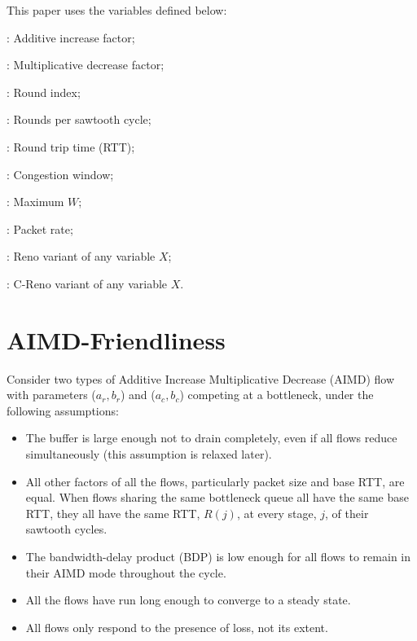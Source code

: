 This paper uses the variables defined below:
\begin{description}[nosep]
	\item[\(a\)]: Additive increase factor;
	\item[\(b\)]: Multiplicative decrease factor;
	\item[\(j\)]: Round index;
	\item[\(J\)]: Rounds per sawtooth cycle;
	\item[\(R(j)\)]: Round trip time (RTT);
	\item[\(W(j)\)]: Congestion window;
	\item[\(\widehat{W}\)]: Maximum \(W\);
	\item[\(r(j)\)]: Packet rate;
	\item[\(X_r\)]: Reno variant of any variable \(X\);
	\item[\(X_c\)]: C-Reno variant of any variable \(X\).
\end{description}

\section{AIMD-Friendliness}\label{AIMD-Friendliness}

Consider two types of Additive Increase Multiplicative Decrease (AIMD) flow with parameters (\(a_r, b_r\)) and (\(a_c, b_c\)) competing at a bottleneck, under the following assumptions:
\begin{itemize}[nosep]
	\item The buffer is large enough not to drain completely, even if all flows reduce simultaneously (this assumption is relaxed later).
	
	\item All other factors of all the flows, particularly packet size and base RTT, are equal. When flows sharing the same bottleneck queue all have the same base RTT, they all have the same RTT, \(R(j)\),  at every stage, \(j\), of their sawtooth cycles. 	
	
	\item The bandwidth-delay product (BDP) is low enough for all flows to remain in their AIMD mode throughout the cycle.

	\item All the flows have run long enough to converge to a steady state.

	\item All flows only respond to the presence of loss, not its extent.
\end{itemize}


